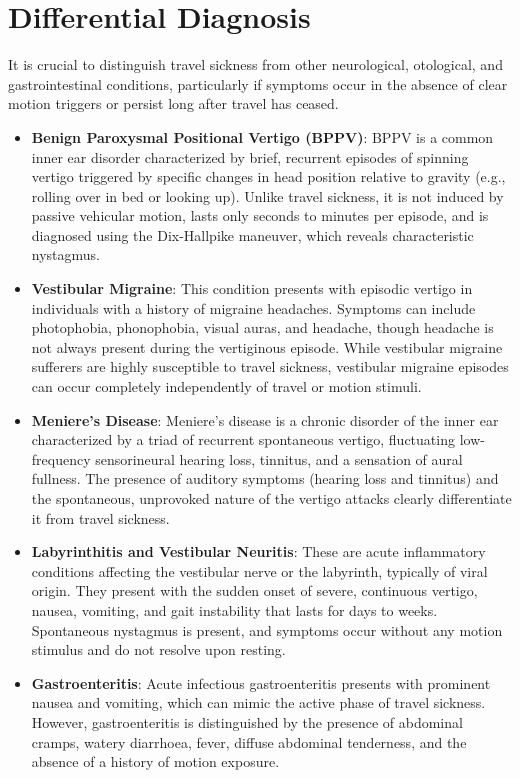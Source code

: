 \section*{Differential Diagnosis}
It is crucial to distinguish travel sickness from other neurological, otological, and gastrointestinal conditions, particularly if symptoms occur in the absence of clear motion triggers or persist long after travel has ceased.
\begin{itemize}
    \item \textbf{Benign Paroxysmal Positional Vertigo (BPPV)}: BPPV is a common inner ear disorder characterized by brief, recurrent episodes of spinning vertigo triggered by specific changes in head position relative to gravity (e.g., rolling over in bed or looking up). Unlike travel sickness, it is not induced by passive vehicular motion, lasts only seconds to minutes per episode, and is diagnosed using the Dix-Hallpike maneuver, which reveals characteristic nystagmus.
    \item \textbf{Vestibular Migraine}: This condition presents with episodic vertigo in individuals with a history of migraine headaches. Symptoms can include photophobia, phonophobia, visual auras, and headache, though headache is not always present during the vertiginous episode. While vestibular migraine sufferers are highly susceptible to travel sickness, vestibular migraine episodes can occur completely independently of travel or motion stimuli.
    \item \textbf{Meniere's Disease}: Meniere's disease is a chronic disorder of the inner ear characterized by a triad of recurrent spontaneous vertigo, fluctuating low-frequency sensorineural hearing loss, tinnitus, and a sensation of aural fullness. The presence of auditory symptoms (hearing loss and tinnitus) and the spontaneous, unprovoked nature of the vertigo attacks clearly differentiate it from travel sickness.
    \item \textbf{Labyrinthitis and Vestibular Neuritis}: These are acute inflammatory conditions affecting the vestibular nerve or the labyrinth, typically of viral origin. They present with the sudden onset of severe, continuous vertigo, nausea, vomiting, and gait instability that lasts for days to weeks. Spontaneous nystagmus is present, and symptoms occur without any motion stimulus and do not resolve upon resting.
    \item \textbf{Gastroenteritis}: Acute infectious gastroenteritis presents with prominent nausea and vomiting, which can mimic the active phase of travel sickness. However, gastroenteritis is distinguished by the presence of abdominal cramps, watery diarrhoea, fever, diffuse abdominal tenderness, and the absence of a history of motion exposure.

\end{itemize}

